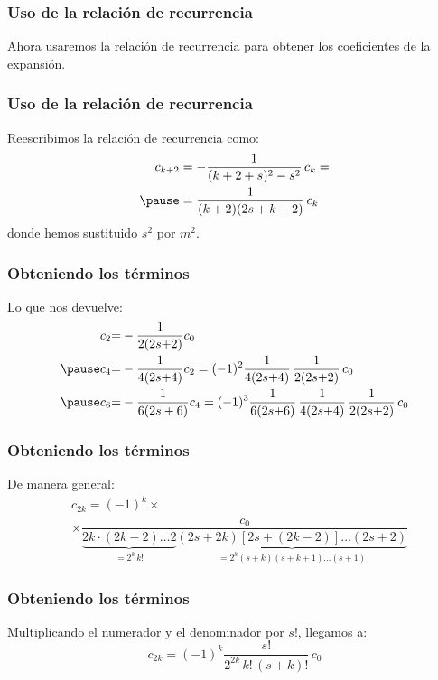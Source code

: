 \documentclass[12pt]{beamer}
\begin{document}
\begin{frame}
\frametitle{Uso de la relación de recurrencia}
Ahora usaremos la relación de recurrencia para obtener los coeficientes de la expansión.
\end{frame}
\begin{frame}
\frametitle{Uso de la relación de recurrencia}
Reescribimos la relación de recurrencia como:
\pause
\begin{eqnarray*}
\begin{aligned}
c_{k+2} &= - \dfrac{1}{(k + 2 + s)^{2} - s^{2}} \, c_{k} = \\ \pause
&= \dfrac{1}{(k + 2)(2 s + k + 2)} \, c_{k}
\end{aligned}
\end{eqnarray*}
donde hemos sustituido $s^{2}$ por $m^{2}$.
\end{frame}
\begin{frame}
\frametitle{Obteniendo los términos}
Lo que nos devuelve:
\pause
\begin{eqnarray*}
\begin{aligned}
c_{2} &{=} - \dfrac{1}{2 (2 s {+} 2)} c_{0} \\ \pause
c_{4} &{=} - \dfrac{1}{4 (2 s {+} 4)} c_{2} = (-1)^{2} \dfrac{1}{4 (2 s {+} 4)} \, \dfrac{1}{2 (2 s {+} 2)} \, c_{0} \\ \pause
c_{6} &{=} - \dfrac{1}{6 (2 s + 6)} c_{4} = (-1)^{3} \dfrac{1}{6 (2 s {+} 6)} \, \dfrac{1}{4 (2 s {+} 4)} \, \dfrac{1}{2 (2 s {+} 2)} \, c_{0} 
\end{aligned}
\end{eqnarray*}
\end{frame}
\begin{frame}
\frametitle{Obteniendo los términos}
De manera general:
\pause
\begin{align*}
&c_{2k} = (-1)^{k} \times \\
&\times \dfrac{c_{0}}{\underbrace{2 k \cdot (2 k {-} 2) \ldots 2}_{=2^{k} \, k!} \underbrace{(2 s {+} 2 k)[2 s {+} (2 k {-} 2)] \ldots (2 s {+} 2)}_{=2^{k} (s {+} k)(s {+} k {+} 1) \ldots (s {+} 1)}}
\end{align*}
\end{frame}
\begin{frame}
\frametitle{Obteniendo los términos}
Multiplicando el numerador y el denominador por $s!$, llegamos a:
\pause
\begin{equation}
c_{2k} = (-1)^{k} \dfrac{s!}{2^{2k} \, k! \, (s+k)!} \, c_{0}
\label{eq:ecuacion_27_09}
\end{equation}
\end{frame}
\end{document}
